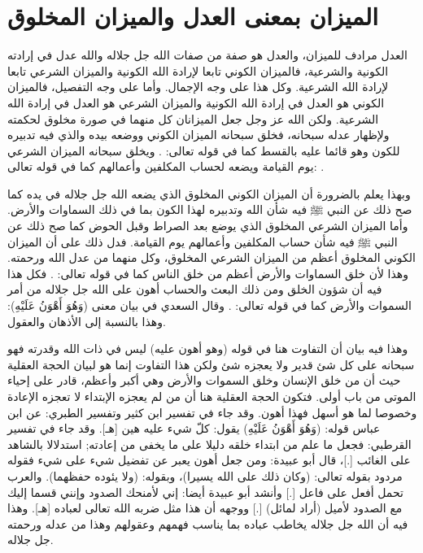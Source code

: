 \section{الميزان بمعنى العدل والميزان المخلوق}

 العدل مرادف للميزان، والعدل هو صفة من صفات الله جل جلاله والله عدل في إرادته الكونية والشرعية، فالميزان الكوني تابعا لإرادة الله الكونية والميزان الشرعي تابعا لإرادة الله الشرعية. وكل هذا على وجه الإجمال. وأما على وجه التفصيل، فالميزان الكوني هو العدل في إرادة الله الكونية والميزان الشرعي هو العدل في إرادة الله الشرعية. ولكن الله عز وجل جعل الميزانان كل منهما في صورة مخلوق لحكمته ولإظهار عدله سبحانه، فخلق سبحانه الميزان الكوني ووضعه بيده والذي فيه تدبيره للكون وهو قائما عليه بالقسط كما في قوله تعالى:
\quranayah*[3][18]{\footnotesize \surahname*[3]}. ويخلق سبحانه الميزان الشرعي يوم القيامة ويضعه لحساب المكلفين وأعمالهم كما في قوله تعالى: 
\quranayah*[21][47]{\footnotesize \surahname*[21]}.

وبهذا يعلم بالضرورة أن الميزان الكوني المخلوق الذي يضعه الله جل جلاله في يده كما صح ذلك عن النبي ﷺ فيه شأن الله وتدبيره لهذا الكون بما في ذلك السماوات والأرض. وأما الميزان الشرعي المخلوق الذي يوضع بعد الصراط وقبل الحوض كما صح ذلك عن النبي ﷺ فيه شأن حساب المكلفين وأعمالهم يوم القيامة. فدل ذلك على أن الميزان الكوني المخلوق أعظم من الميزان الشرعي المخلوق، وكل منهما من عدل الله ورحمته. وهذا لأن خلق السماوات والأرض أعظم من خلق الناس كما في قوله تعالى: 
\quranayah*[40][57]{\footnotesize \surahname*[40]}. فكل هذا فيه أن شؤون الخلق ومن ذلك البعث والحساب أهون على الله جل جلاله من أمر السموات والأرض كما في قوله تعالى: 
\quranayah*[30][27]{\footnotesize \surahname*[30]}. وقال السعدي في بيان معنى (وَهُوَ أَهْوَنُ عَلَيْهِ): وهذا بالنسبة إلى الأذهان والعقول.

وهذا فيه بيان أن التفاوت هنا في قوله (وهو أهون عليه) ليس في ذات الله وقدرته فهو سبحانه على كل شئ قدير ولا يعجزه شئ ولكن هذا التفاوت إنما هو لبيان الحجة العقلية حيث أن من خلق الإنسان وخلق السموات والأرض وهي أكبر وأعظم، قادر على إحياء الموتى من باب أولى. فتكون الحجة العقلية هنا أن من لم يعجزه الإبتداء لا تعجزه الإعادة وخصوصا لما هو أسهل فهذا أهون. وقد جاء في تفسير ابن كثير وتفسير الطبري: عن ابن عباس قوله: (وَهُوَ أَهْوَنُ عَلَيْهِ) يقول: كلّ شيء عليه هين [هـ]. وقد جاء في تفسير القرطبي: فجعل ما علم من ابتداء خلقه دليلا على ما يخفى من إعادته; استدلالا بالشاهد على الغائب  [.]، قال أبو عبيدة: ومن جعل أهون يعبر عن تفضيل شيء على شيء فقوله مردود بقوله تعالى: (وكان ذلك على الله يسيرا)، وبقوله: (ولا يئوده حفظهما). والعرب تحمل أفعل على فاعل [.] وأنشد أبو عبيدة أيضا: إني لأمنحك الصدود وإنني قسما إليك مع الصدود لأميل (أراد لمائل) [.] ووجهه أن هذا مثل ضربه الله تعالى لعباده [هـ]. وهذا فيه أن الله جل جلاله يخاطب عباده بما يناسب فهمهم وعقولهم وهذا من عدله ورحمته جل جلاله.

